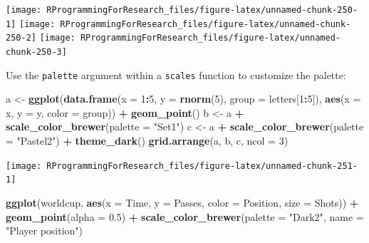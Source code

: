 \documentclass[]{book}
\makeatletter
\newenvironment{Shaded}{\begin{snugshade}}{\end{snugshade}}
\newcommand{\KeywordTok}[1]{\textcolor[rgb]{0.13,0.29,0.53}{\textbf{#1}}}
\newcommand{\DataTypeTok}[1]{\textcolor[rgb]{0.13,0.29,0.53}{#1}}
\newcommand{\DecValTok}[1]{\textcolor[rgb]{0.00,0.00,0.81}{#1}}
\newcommand{\FloatTok}[1]{\textcolor[rgb]{0.00,0.00,0.81}{#1}}
\newcommand{\StringTok}[1]{\textcolor[rgb]{0.31,0.60,0.02}{#1}}
\newcommand{\OperatorTok}[1]{\textcolor[rgb]{0.81,0.36,0.00}{\textbf{#1}}}
\newcommand{\NormalTok}[1]{#1}
\newenvironment{kframe}{%
\medskip{}
\setlength{\fboxsep}{.8em}
 \def\at@end@of@kframe{}%
 \ifinner\ifhmode%
  \def\at@end@of@kframe{\end{minipage}}%
  \begin{minipage}{\columnwidth}%
 \fi\fi%
 \def\FrameCommand##1{\hskip\@totalleftmargin \hskip-\fboxsep
 \colorbox{shadecolor}{##1}\hskip-\fboxsep
     \hskip-\linewidth \hskip-\@totalleftmargin \hskip\columnwidth}%
 \MakeFramed {\advance\hsize-\width
   \@totalleftmargin\z@ \linewidth\hsize
   \@setminipage}}%
 {\par\unskip\endMakeFramed%
 \at@end@of@kframe}
\renewenvironment{Shaded}{\begin{kframe}}{\end{kframe}}
\theoremstyle{definition}
\theoremstyle{definition}
\theoremstyle{definition}
\theoremstyle{remark}
\makeatother
\begin{document}
\texttt{[image: RProgrammingForResearch\_files/figure-latex/unnamed-chunk-250-1]}
\texttt{[image: RProgrammingForResearch\_files/figure-latex/unnamed-chunk-250-2]}
\texttt{[image: RProgrammingForResearch\_files/figure-latex/unnamed-chunk-250-3]}

Use the \texttt{palette} argument within a \texttt{scales} function to
customize the palette:

\begin{Shaded}
\begin{Highlighting}[]
\NormalTok{a <-}\StringTok{ }\KeywordTok{ggplot}\NormalTok{(}\KeywordTok{data.frame}\NormalTok{(}\DataTypeTok{x =} \DecValTok{1}\OperatorTok{:}\DecValTok{5}\NormalTok{, }\DataTypeTok{y =} \KeywordTok{rnorm}\NormalTok{(}\DecValTok{5}\NormalTok{),}
                       \DataTypeTok{group =}\NormalTok{ letters[}\DecValTok{1}\OperatorTok{:}\DecValTok{5}\NormalTok{]),}
            \KeywordTok{aes}\NormalTok{(}\DataTypeTok{x =}\NormalTok{ x, }\DataTypeTok{y =}\NormalTok{ y, }\DataTypeTok{color =}\NormalTok{ group)) }\OperatorTok{+}\StringTok{ }
\StringTok{  }\KeywordTok{geom_point}\NormalTok{()}
\NormalTok{b <-}\StringTok{ }\NormalTok{a }\OperatorTok{+}\StringTok{ }\KeywordTok{scale_color_brewer}\NormalTok{(}\DataTypeTok{palette =} \StringTok{"Set1"}\NormalTok{)}
\NormalTok{c <-}\StringTok{ }\NormalTok{a }\OperatorTok{+}\StringTok{ }\KeywordTok{scale_color_brewer}\NormalTok{(}\DataTypeTok{palette =} \StringTok{"Pastel2"}\NormalTok{) }\OperatorTok{+}\StringTok{ }
\StringTok{  }\KeywordTok{theme_dark}\NormalTok{()}
\KeywordTok{grid.arrange}\NormalTok{(a, b, c, }\DataTypeTok{ncol =} \DecValTok{3}\NormalTok{)}
\end{Highlighting}
\end{Shaded}

\texttt{[image: RProgrammingForResearch\_files/figure-latex/unnamed-chunk-251-1]}

\begin{Shaded}
\begin{Highlighting}[]
\KeywordTok{ggplot}\NormalTok{(worldcup, }\KeywordTok{aes}\NormalTok{(}\DataTypeTok{x =}\NormalTok{ Time, }\DataTypeTok{y =}\NormalTok{ Passes,}
                     \DataTypeTok{color =}\NormalTok{ Position, }\DataTypeTok{size =}\NormalTok{ Shots)) }\OperatorTok{+}\StringTok{ }
\StringTok{  }\KeywordTok{geom_point}\NormalTok{(}\DataTypeTok{alpha =} \FloatTok{0.5}\NormalTok{) }\OperatorTok{+}\StringTok{ }
\StringTok{  }\KeywordTok{scale_color_brewer}\NormalTok{(}\DataTypeTok{palette =} \StringTok{"Dark2"}\NormalTok{,}
                     \DataTypeTok{name =} \StringTok{"Player position"}\NormalTok{)}
\end{Highlighting}
\end{Shaded}
\end{document}
